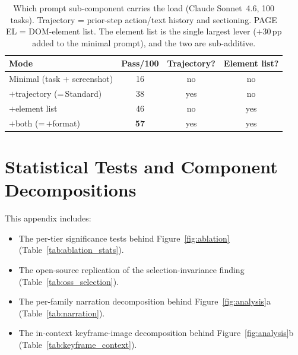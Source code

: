 \documentclass[11pt]{article}
\begin{document}
\begin{table}[!h]
\centering
\caption{Which prompt sub-component carries the load (Claude Sonnet~4.6, 100
tasks). Trajectory = prior-step action/text history and sectioning. PAGE EL =
DOM-element list. The element list is the single largest lever ($+30$\,pp added to
the minimal prompt), and the two are sub-additive.}
\label{tab:a2_decomp}
\small
\begin{tabular}{@{}l ccc@{}}
\toprule
\textbf{Mode} & \textbf{Pass/100} & \textbf{Trajectory?} & \textbf{Element list?} \\
\midrule
Minimal (task + screenshot) & 16 & no  & no  \\
$+$trajectory (=\,Standard) & 38 & yes & no  \\
$+$element list             & 46 & no  & yes \\
$+$both (=\,$+$format)      & \textbf{57} & yes & yes \\
\bottomrule
\end{tabular}
\end{table}

\section{Statistical Tests and Component Decompositions}
\label{app:stats}

This appendix includes:
\begin{itemize}
  \item The per-tier significance tests behind Figure~\ref{fig:ablation} (Table~\ref{tab:ablation_stats}).
\item The open-source replication of the selection-invariance finding (Table~\ref{tab:oss_selection}).
\item The per-family narration decomposition behind Figure~\ref{fig:analysis}a (Table~\ref{tab:narration}).
\item The in-context keyframe-image decomposition behind Figure~\ref{fig:analysis}b (Table~\ref{tab:keyframe_context}).
\end{itemize}
\end{document}
